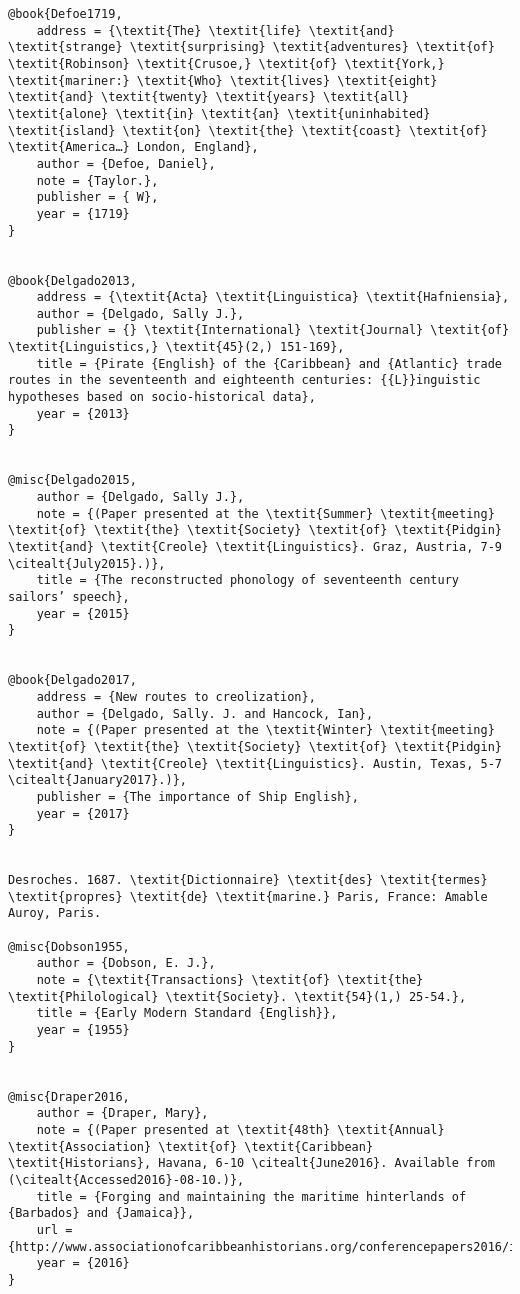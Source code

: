 \begin{verbatim}
@book{Defoe1719,
	address = {\textit{The} \textit{life} \textit{and} \textit{strange} \textit{surprising} \textit{adventures} \textit{of} \textit{Robinson} \textit{Crusoe,} \textit{of} \textit{York,} \textit{mariner:} \textit{Who} \textit{lives} \textit{eight} \textit{and} \textit{twenty} \textit{years} \textit{all} \textit{alone} \textit{in} \textit{an} \textit{uninhabited} \textit{island} \textit{on} \textit{the} \textit{coast} \textit{of} \textit{America…} London, England},
	author = {Defoe, Daniel},
	note = {Taylor.},
	publisher = { W},
	year = {1719}
}


@book{Delgado2013,
	address = {\textit{Acta} \textit{Linguistica} \textit{Hafniensia},
	author = {Delgado, Sally J.},
	publisher = {} \textit{International} \textit{Journal} \textit{of} \textit{Linguistics,} \textit{45}(2,) 151-169},
	title = {Pirate {English} of the {Caribbean} and {Atlantic} trade routes in the seventeenth and eighteenth centuries: {{L}}inguistic hypotheses based on socio-historical data},
	year = {2013}
}


@misc{Delgado2015,
	author = {Delgado, Sally J.},
	note = {(Paper presented at the \textit{Summer} \textit{meeting} \textit{of} \textit{the} \textit{Society} \textit{of} \textit{Pidgin} \textit{and} \textit{Creole} \textit{Linguistics}. Graz, Austria, 7-9 \citealt{July2015}.)},
	title = {The reconstructed phonology of seventeenth century sailors’ speech},
	year = {2015}
}


@book{Delgado2017,
	address = {New routes to creolization},
	author = {Delgado, Sally. J. and Hancock, Ian},
	note = {(Paper presented at the \textit{Winter} \textit{meeting} \textit{of} \textit{the} \textit{Society} \textit{of} \textit{Pidgin} \textit{and} \textit{Creole} \textit{Linguistics}. Austin, Texas, 5-7 \citealt{January2017}.)},
	publisher = {The importance of Ship English},
	year = {2017}
}


Desroches. 1687. \textit{Dictionnaire} \textit{des} \textit{termes} \textit{propres} \textit{de} \textit{marine.} Paris, France: Amable Auroy, Paris.

@misc{Dobson1955,
	author = {Dobson, E. J.},
	note = {\textit{Transactions} \textit{of} \textit{the} \textit{Philological} \textit{Society}. \textit{54}(1,) 25-54.},
	title = {Early Modern Standard {English}},
	year = {1955}
}


@misc{Draper2016,
	author = {Draper, Mary},
	note = {(Paper presented at \textit{48th} \textit{Annual} \textit{Association} \textit{of} \textit{Caribbean} \textit{Historians}, Havana, 6-10 \citealt{June2016}. Available from  (\citealt{Accessed2016}-08-10.)},
	title = {Forging and maintaining the maritime hinterlands of {Barbados} and {Jamaica}},
	url = {http://www.associationofcaribbeanhistorians.org/conferencepapers2016/index.htm)},
	year = {2016}
}



\end{verbatim}
